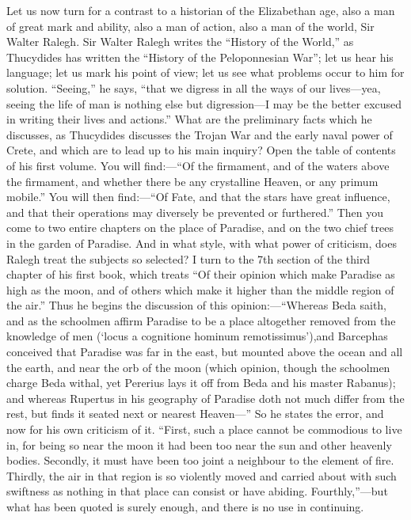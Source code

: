 Let us now turn for a contrast to a historian of the Elizabethan age,
also a man of great mark and ability, also a man of action, also a man
of the world, Sir Walter Ralegh. Sir Walter Ralegh writes the ``History
of the World,'' as Thucydides has written the ``History of the
Peloponnesian War''; let us hear his language; let us mark his point of
view; let us see what problems occur to him for solution. ``Seeing,'' he
says, ``that we digress in all the ways of our lives---yea, seeing the
life of man is nothing else but digression---I may be the better excused
in writing their lives and actions.'' What are the preliminary facts
which he discusses, as Thucydides discusses the Trojan War and the early
naval power of Crete, and which are to lead up to his main inquiry? Open
the table of contents of his first volume. You will find:---``Of the
firmament, and of the waters above the firmament, and whether there be
any crystalline Heaven, or any primum mobile.'' You will then
find:---``Of Fate, and that the stars have great influence, and that
their operations may diversely be prevented or furthered.'' Then you
come to two entire chapters on the place of Paradise, and on the two
chief trees in the garden of Paradise. And in what style, with what
power of criticism, does Ralegh treat the subjects so selected? I turn
to the 7th section of the third chapter of his first book, which treats
``Of their opinion which make Paradise as high as the moon, and of
others which make it higher than the middle region of the air.'' Thus he
begins the discussion of this opinion:---``Whereas Beda saith, and as
the schoolmen affirm Paradise to be a place altogether removed from the
knowledge of men (`locus a cognitione hominum remotissimus'),and
Barcephas conceived that Paradise was far in the east, but mounted above
the ocean and all the earth, and near the orb of the moon (which
opinion, though the schoolmen charge Beda withal, yet Pererius lays it
off from Beda and his master Rabanus); and whereas Rupertus in his
geography of Paradise doth not much differ from the rest, but finds it
seated next or nearest Heaven---'' So he states the error, and now for
his own criticism of it. ``First, such a place cannot be commodious to
live in, for being so near the moon it had been too near the sun and
other heavenly bodies. Secondly, it must have been too joint a neighbour
to the element of fire. Thirdly, the air in that region is so violently
moved and carried about with such swiftness as nothing in that place can
consist or have abiding. Fourthly,''---but what has been quoted is
surely enough, and there is no use in continuing.

